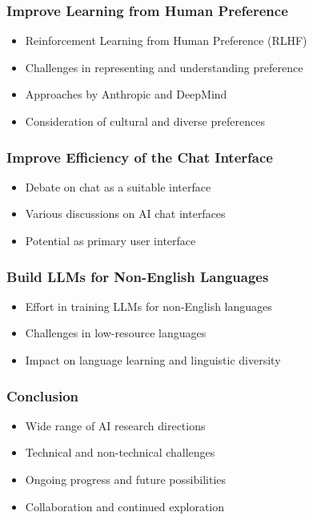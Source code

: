 \begin{frame}[fragile]
  \frametitle{Improve Learning from Human Preference}
  \begin{itemize}
    \item Reinforcement Learning from Human Preference (RLHF)
    \item Challenges in representing and understanding preference
    \item Approaches by Anthropic and DeepMind
    \item Consideration of cultural and diverse preferences
  \end{itemize}
\end{frame}

\begin{frame}[fragile]
  \frametitle{Improve Efficiency of the Chat Interface}
  \begin{itemize}
    \item Debate on chat as a suitable interface
    \item Various discussions on AI chat interfaces
    \item Potential as primary user interface
  \end{itemize}
\end{frame}

\begin{frame}[fragile]
  \frametitle{Build LLMs for Non-English Languages}
  \begin{itemize}
    \item Effort in training LLMs for non-English languages
    \item Challenges in low-resource languages
    \item Impact on language learning and linguistic diversity
  \end{itemize}
\end{frame}

\begin{frame}[fragile]
  \frametitle{Conclusion}
  \begin{itemize}
    \item Wide range of AI research directions
    \item Technical and non-technical challenges
    \item Ongoing progress and future possibilities
    \item Collaboration and continued exploration
  \end{itemize}
\end{frame}

